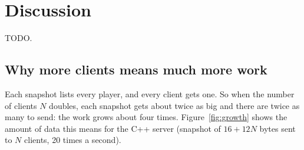 \documentclass[11pt]{article}
\begin{document}
\section{Discussion}
TODO.


\subsection{Why more clients means much more work}
Each snapshot lists every player, and every client gets one. So when the number of
clients $N$ doubles, each snapshot gets about twice as big and there are twice as
many to send: the work grows about four times. Figure~\ref{fig:growth} shows the
amount of data this means for the C++ server (snapshot of $16 + 12N$ bytes sent to
$N$ clients, 20 times a second).
\end{document}
